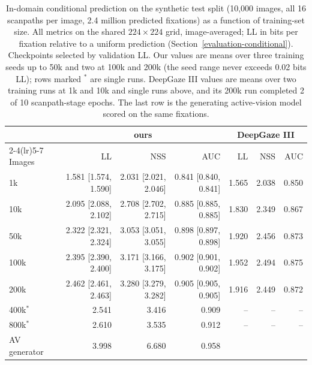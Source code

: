 
\begin{table}[t]
  \centering
  \small
  \begin{tabular}{lrrrrrr}
    \toprule
    & \multicolumn{3}{c}{ours} & \multicolumn{3}{c}{DeepGaze III} \\
    \cmidrule(lr){2-4}\cmidrule(lr){5-7}
    Images & LL & NSS & AUC & LL & NSS & AUC \\
    \midrule
    1k & 1.581 \scriptsize[1.574, 1.590] & 2.031 \scriptsize[2.021, 2.046] & 0.841 \scriptsize[0.840, 0.841] & 1.565 & 2.038 & 0.850 \\
    10k & 2.095 \scriptsize[2.088, 2.102] & 2.708 \scriptsize[2.702, 2.715] & 0.885 \scriptsize[0.885, 0.885] & 1.830 & 2.349 & 0.867 \\
    50k & 2.322 \scriptsize[2.321, 2.324] & 3.053 \scriptsize[3.051, 3.055] & 0.898 \scriptsize[0.897, 0.898] & 1.920 & 2.456 & 0.873 \\
    100k & 2.395 \scriptsize[2.390, 2.400] & 3.171 \scriptsize[3.166, 3.175] & 0.902 \scriptsize[0.901, 0.902] & 1.952 & 2.494 & 0.875 \\
    200k & 2.462 \scriptsize[2.461, 2.463] & 3.280 \scriptsize[3.279, 3.282] & 0.905 \scriptsize[0.905, 0.905] & 1.916 & 2.449 & 0.872 \\[1pt]
    400k$^{*}$ & 2.541 & 3.416 & 0.909 & -- & -- & -- \\
    800k$^{*}$ & 2.610 & 3.535 & 0.912 & -- & -- & -- \\
    \midrule
    AV generator & 3.998 & 6.680 & 0.958 & \multicolumn{3}{c}{} \\
    \bottomrule
  \end{tabular}
  \caption{In-domain conditional prediction on the synthetic test split (10,000 images, all 16 scanpaths per image, 2.4 million predicted fixations) as a function of training-set size. All metrics on the shared $224\times224$ grid, image-averaged; LL in bits per fixation relative to a uniform prediction (Section~\ref{evaluation-conditional}). Checkpoints selected by validation LL. Our values are means over three training seeds up to 50k and two at 100k and 200k (the seed range never exceeds 0.02 bits LL); rows marked $^{*}$ are single runs. DeepGaze III values are means over two training runs at 1k and 10k and single runs above, and its 200k run completed 2 of 10 scanpath-stage epochs. The last row is the generating active-vision model scored on the same fixations.}
  \label{tab:indomain}
\end{table}

